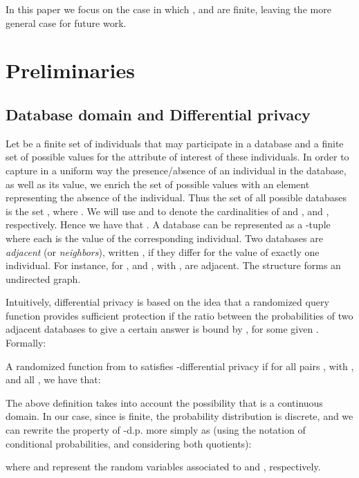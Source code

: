 \documentclass{llncs}
\begin{document}
In this paper we focus on the case in which ,  and  are finite, leaving the more general case for future work. 

\section{Preliminaries}
\label{section:preliminaries}

\subsection{Database domain and Differential privacy}

Let  be a finite set of individuals that may participate in a database and  a finite
set of possible values for the attribute of interest of these individuals. In order to capture in a uniform way the presence/absence of an individual in the database, as well as its value, 
we enrich the set of possible values with an element  representing the absence of the individual. Thus the set of all possible databases is the set , where . 
We will use  and  to denote the cardinalities of   and ,  and , respectively. Hence we have that . 
A database  can be represented as a 
-tuple  where each  is the value of the corresponding individual. 
Two databases  are \emph{adjacent} (or \emph{neighbors}), written , if they differ for the value of exactly one individual. For instance, for ,  and , with , are adjacent. 
The structure  forms an undirected graph. 


Intuitively, differential privacy is based on the idea that a randomized query function  provides sufficient protection if the ratio between the probabilities of two adjacent databases to give a certain answer is bound by , for some given . 
Formally:
\begin{definition}
	\label{def:diff-privacy-1}
	A randomized function  from  to  satisfies {-differential privacy} if for all pairs , with , and all , we have that:
		
\end{definition}

The above definition takes into account the possibility that  is a continuous domain. In our case, since  is finite, the probability distribution is discrete, and we can rewrite the property of -d.p.  more simply as (using the notation of conditional probabilities, and considering both quotients): 

where  and  represent the random variables associated to  and , respectively. 
\end{document}
